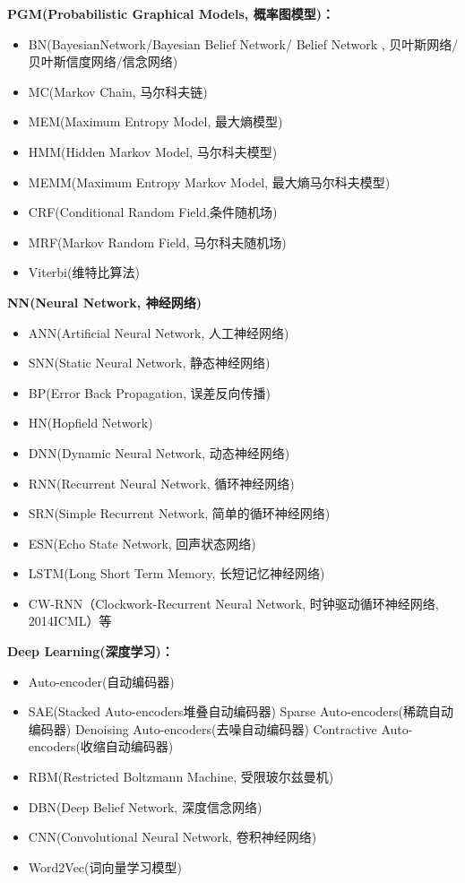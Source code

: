 \documentclass[10pt,a4paper]{ctexbook}
\begin{document}
\textbf{PGM(Probabilistic Graphical Models, 概率图模型)：}
\begin{itemize}
\item BN(BayesianNetwork/Bayesian Belief Network/ Belief Network , 贝叶斯网络/贝叶斯信度网络/信念网络)
\item MC(Markov Chain, 马尔科夫链)
\item MEM(Maximum Entropy Model, 最大熵模型)
\item HMM(Hidden Markov Model, 马尔科夫模型)
\item MEMM(Maximum Entropy Markov Model, 最大熵马尔科夫模型)
\item CRF(Conditional Random Field,条件随机场)
\item MRF(Markov Random Field, 马尔科夫随机场)
\item Viterbi(维特比算法)
\end{itemize}


\textbf{NN(Neural Network, 神经网络)}
\begin{itemize}
\item ANN(Artificial Neural Network, 人工神经网络)
\item SNN(Static Neural Network, 静态神经网络)
\item BP(Error Back Propagation, 误差反向传播)
\item HN(Hopfield Network)
\item DNN(Dynamic Neural Network, 动态神经网络)
\item RNN(Recurrent Neural Network, 循环神经网络)
\item SRN(Simple Recurrent Network, 简单的循环神经网络)
\item ESN(Echo State Network, 回声状态网络)
\item LSTM(Long Short Term Memory, 长短记忆神经网络)
\item CW-RNN（Clockwork-Recurrent Neural Network, 时钟驱动循环神经网络, 2014ICML）等
\end{itemize}

\textbf{Deep Learning(深度学习)：}
\begin{itemize}
\item Auto-encoder(自动编码器)
\item SAE(Stacked Auto-encoders堆叠自动编码器) 
    \subitem Sparse Auto-encoders(稀疏自动编码器)
    \subitem Denoising Auto-encoders(去噪自动编码器)
    \subitem Contractive Auto-encoders(收缩自动编码器)
\item RBM(Restricted Boltzmann Machine, 受限玻尔兹曼机)
\item DBN(Deep Belief Network, 深度信念网络)
\item CNN(Convolutional Neural Network, 卷积神经网络)
\item Word2Vec(词向量学习模型)
\end{itemize}
\end{document}
